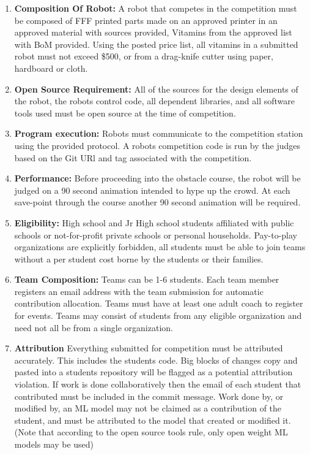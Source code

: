 \documentclass{article}
\begin{document}
\begin{enumerate}
	
\item \textbf{Composition Of Robot:} A robot that competes in the competition must be composed of FFF printed parts made on an approved printer in an approved material with sources provided, Vitamins from the approved list with BoM provided. Using the posted price list, all vitamins in a submitted robot must not exceed \$500, or from a drag-knife cutter using paper, hardboard or cloth. 

\item \textbf{Open Source Requirement:} All of the sources for the design elements of the robot, the robots control code, all dependent libraries, and all software tools used must be open source at the time of competition. 

\item \textbf{Program execution:} Robots must communicate to the competition station using the provided protocol. A robots competition code is run by the judges based on the Git URl and tag associated with the competition. 


\item \textbf{Performance:} Before proceeding into the obstacle course, the robot will be judged on a 90 second animation intended to hype up the crowd. At each save-point through the course another 90 second animation will be required. 

\item \textbf{Eligibility:} High school and Jr High school students affiliated with public schools or not-for-profit private schools or personal households. Pay-to-play organizations are explicitly forbidden, all students must be able to join teams without a per student cost borne by the students or their families. 


\item \textbf{Team Composition:} Teams can be 1-6 students. Each team member registers an email address with the team submission for automatic contribution allocation. Teams must have at least one adult coach to register for events. Teams may consist of students from any eligible organization and need not all be from a single organization.  

 
\item \textbf{Attribution} Everything submitted for competition must be attributed accurately. This includes the students code. Big blocks of changes copy and pasted into a students repository will be flagged as a potential attribution violation. If work is done collaboratively then the email of each student that contributed must be included in the commit message. Work done by, or modified by, an ML model may not be claimed as a contribution of the student, and must be attributed to the model that created or modified it. (Note that according to the open source tools rule, only open weight ML models may be used)




\end{enumerate}
\end{document}

